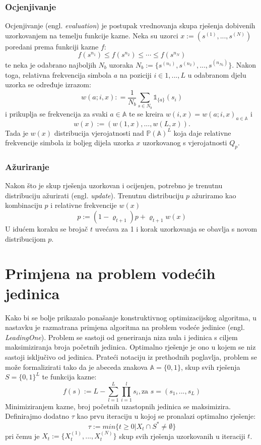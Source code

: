\documentclass[times, utf8, zavrsni]{fer}
\begin{document}
\subsection{Ocjenjivanje}
Ocjenjivanje (engl. \textit{evaluation}) je postupak vrednovanja skupa rješenja dobivenih uzorkovanjem na temelju funkcije kazne.
Neka su uzorci $x := (s^{(1)},...,s^{(N)})$ poredani prema funkciji kazne $f$:
$$
f(s^{n_1}) \leq f(s^{n_2}) \leq \cdots \leq f(s^{n_N})
$$
te neka je odabrano najboljih $N_b$ uzoraka $N_b := \{ s^{(n_1)}, s^{(n_2)},...,s^{(n_{N_b})} \}$. Nakon toga, relativna frekvencija simbola $a$ na poziciji $i \in {1,..., L}$
u odabranom djelu uzorka se određuje izrazom:
$$
w(a; i, x) : = \frac{1}{N_b} \sum_{s \in N_b} \mathds{1}_{\{a\}}(s_i)
$$
i prikuplja se frekvencija za svaki $a \in \mathbb{A}$ te se kreira $w(i, x) = w(a;i, x)_{a \in \mathbb{A}}$ i
$$
w(x) := (w(1, x),...,w(L, x)).
$$
Tada je $w(x)$ distribucija vjerojatnosti nad $\mathbb{P}(\mathbb{A})^L$ koja daje relativne frekvencije simbola iz boljeg dijela uzorka $x$ uzorkovanog s vjerojatnosti $Q_p$.

\subsection{Ažuriranje}
Nakon što je skup rješenja uzorkovan i ocijenjen, potrebno je trenutnu distribuciju ažurirati (engl. \textit{update}).
Trenutnu distribuciju $p$ ažuriramo kao kombinaciju $p$ i relativne frekvencije $w(x)$
$$
p := (1 - \varrho_{t+1})p + \varrho_{t+1} w(x)
$$
U idućem koraku se brojač $t$ uvećava za 1 i korak uzorkovanja se obavlja s novom distribucijom $p$.


\chapter{Primjena na problem vodećih jedinica}
Kako bi se bolje prikazalo ponašanje konstruktivnog optimizacijskog algoritma, u nastavku je razmatrana primjena algoritma na
problem vodeće jedinice (engl. \textit{LeadingOne}). Problem se sastoji od generiranja niza nula i jedinica s ciljem maksimiziranja broja početnih jedinica. Optimalno
rješenje je ono u kojem se niz sastoji isključivo od jedinica. Prateći notaciju iz prethodnih poglavlja, problem se može formalizirati tako da
je abeceda znakova $\mathbb{A} = \{0, 1\}$, skup svih rješenja $S = \{0, 1\}^L$ te funkcija kazne:
$$
f(s) := L - \sum^L_{l=1} \prod^l_{i=1} s_i, \text{za }  s=(s_1,..., s_L)
$$
Minimiziranjem kazne, broj početnih uzastopnih jedinica se maksimizira.
Definirajmo dodatno $\tau$ kao prvu iteraciju u kojoj se pronalazi optimalno rješenje:
$$
\tau := min \{ t \geq 0 | X_t \cap S^* \neq \emptyset \}
$$
pri čemu je $X_t :=  \{ X^{(1)}_t,...,X^{(N)}_t \} $ skup svih rješenja uzorkovanih u iteraciji $t$.
\end{document}
